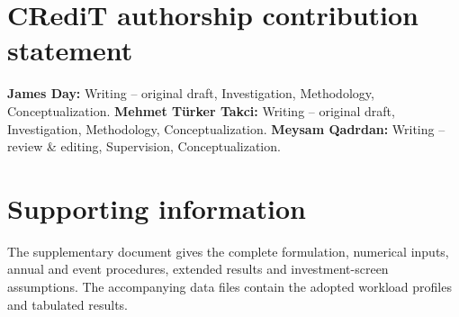 \documentclass[journal]{IEEEtran}
\begin{document}
\section*{CRediT authorship contribution statement}
\textbf{James Day:} Writing -- original draft, Investigation, Methodology, Conceptualization. \textbf{Mehmet T\"urker Takci:} Writing -- original draft, Investigation, Methodology, Conceptualization. \textbf{Meysam Qadrdan:} Writing -- review \& editing, Supervision, Conceptualization.
\section*{Supporting information}
The supplementary document gives the complete formulation, numerical inputs, annual and event procedures, extended results and investment-screen assumptions. The accompanying data files contain the adopted workload profiles and tabulated results.


\end{document}
